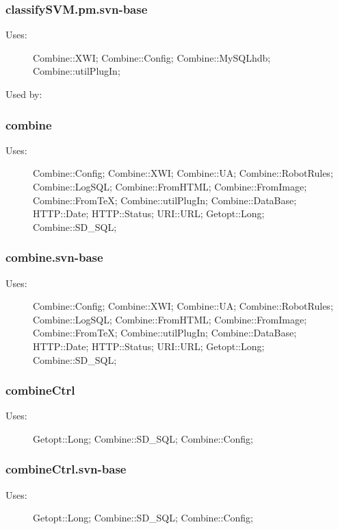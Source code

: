 \subsubsection{classifySVM.pm.svn-base}
\begin{description}
\item[Uses:] Combine::XWI; Combine::Config; Combine::MySQLhdb; Combine::utilPlugIn; 

\item[Used by:] 

\end{description}
\subsubsection{combine}
\begin{description}
\item[Uses:] Combine::Config; Combine::XWI; Combine::UA; Combine::RobotRules; Combine::LogSQL; Combine::FromHTML; Combine::FromImage; Combine::FromTeX; Combine::utilPlugIn; Combine::DataBase; HTTP::Date; HTTP::Status; URI::URL; Getopt::Long; Combine::SD\_SQL; 

\end{description}
\subsubsection{combine.svn-base}
\begin{description}
\item[Uses:] Combine::Config; Combine::XWI; Combine::UA; Combine::RobotRules; Combine::LogSQL; Combine::FromHTML; Combine::FromImage; Combine::FromTeX; Combine::utilPlugIn; Combine::DataBase; HTTP::Date; HTTP::Status; URI::URL; Getopt::Long; Combine::SD\_SQL; 

\end{description}
\subsubsection{combineCtrl}
\begin{description}
\item[Uses:] Getopt::Long; Combine::SD\_SQL; Combine::Config; 

\end{description}
\subsubsection{combineCtrl.svn-base}
\begin{description}
\item[Uses:] Getopt::Long; Combine::SD\_SQL; Combine::Config; 

\end{description}
